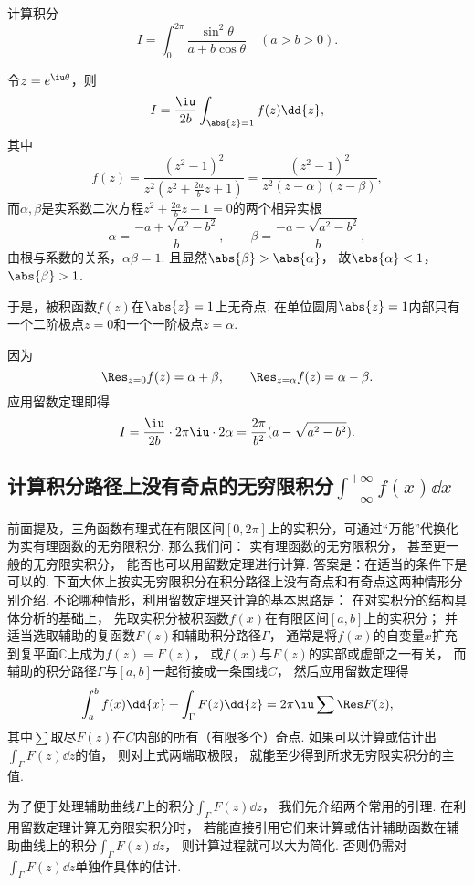 \begin{example}
计算积分\[
	I = \int_0^{2\pi} \frac{\sin^2 \theta}{a+b\cos\theta} \quad(a>b>0).
\]
\begin{solution}
令\(z=e^{\iu\theta}\)，则\[
	I = \frac{\iu}{2b} \int_{\abs{z}=1} f(z) \dd{z},
\]
其中\[
	f(z) = \frac{(z^2-1)^2}{z^2 \left(z^2+\frac{2a}{b}z+1\right)}
	= \frac{(z^2-1)^2}{z^2(z-\alpha)(z-\beta)},
\]
而\(\alpha,\beta\)是实系数二次方程\(z^2+\frac{2a}{b}z+1=0\)的两个相异实根\[
	\alpha=\frac{-a+\sqrt{a^2-b^2}}{b},
	\qquad
	\beta=\frac{-a-\sqrt{a^2-b^2}}{b},
\]
由根与系数的关系，\(\alpha\beta=1\).
且显然\(\abs{\beta}>\abs{\alpha}\)，
故\(\abs{\alpha}<1\)，
\(\abs{\beta}>1\).

于是，被积函数\(f(z)\)在\(\abs{z}=1\)上无奇点.
在单位圆周\(\abs{z}=1\)内部只有一个二阶极点\(z=0\)和一个一阶极点\(z=\alpha\).

因为\[
	\Res_{z=0} f(z) = \alpha+\beta,
	\qquad
	\Res_{z=\alpha} f(z) = \alpha-\beta.
\]
应用留数定理即得\[
	I = \frac{\iu}{2b} \cdot 2\pi\iu \cdot 2\alpha
	= \frac{2\pi}{b^2} (a-\sqrt{a^2-b^2}).
\]
\end{solution}
\end{example}

\subsection{计算积分路径上没有奇点的无穷限积分\texorpdfstring{\(\int_{-\infty}^{+\infty} f(x) \dd{x}\)}{}}
前面提及，三角函数有理式在有限区间\([0,2\pi]\)上的实积分，可通过“万能”代换化为实有理函数的无穷限积分.
那么我们问：
实有理函数的无穷限积分，
甚至更一般的无穷限实积分，
能否也可以用留数定理进行计算.
答案是：在适当的条件下是可以的.
下面大体上按实无穷限积分在积分路径上没有奇点和有奇点这两种情形分别介绍.
不论哪种情形，利用留数定理来计算的基本思路是：
在对实积分的结构具体分析的基础上，
先取实积分被积函数\(f(x)\)在有限区间\([a,b]\)上的实积分；
并适当选取辅助的复函数\(F(z)\)和辅助积分路径\(\Gamma\)，
通常是将\(f(x)\)的自变量\(x\)扩充到复平面\(\mathbb{C}\)上成为\(f(z)=F(z)\)，
或\(f(x)\)与\(F(z)\)的实部或虚部之一有关，
而辅助的积分路径\(\Gamma\)与\([a,b]\)一起衔接成一条围线\(C\)，
然后应用留数定理得\begin{equation}
	\int_a^b f(x) \dd{x}
	+ \int_\Gamma F(z) \dd{z}
	= 2\pi\iu \sum \Res F(z),
\end{equation}
其中\(\sum\)取尽\(F(z)\)在\(C\)内部的所有（有限多个）奇点.
如果可以计算或估计出\(\int_\Gamma F(z) \dd{z}\)的值，
则对上式两端取极限，
就能至少得到所求无穷限实积分的主值.

为了便于处理辅助曲线\(\Gamma\)上的积分\(\int_\Gamma F(z) \dd{z}\)，
我们先介绍两个常用的引理.
在利用留数定理计算无穷限实积分时，
若能直接引用它们来计算或估计辅助函数在辅助曲线上的积分\(\int_\Gamma F(z) \dd{z}\)，
则计算过程就可以大为简化.
否则仍需对\(\int_\Gamma F(z) \dd{z}\)单独作具体的估计.


